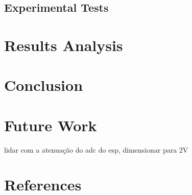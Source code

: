 \documentclass[12pt]{article}
\begin{document}
\subsection{Experimental Tests}

\section{Results Analysis}

\section{Conclusion}

\section{Future Work}
lidar com a atenuação do adc do esp, dimensionar para 2V


\section{References}



\end{document}
